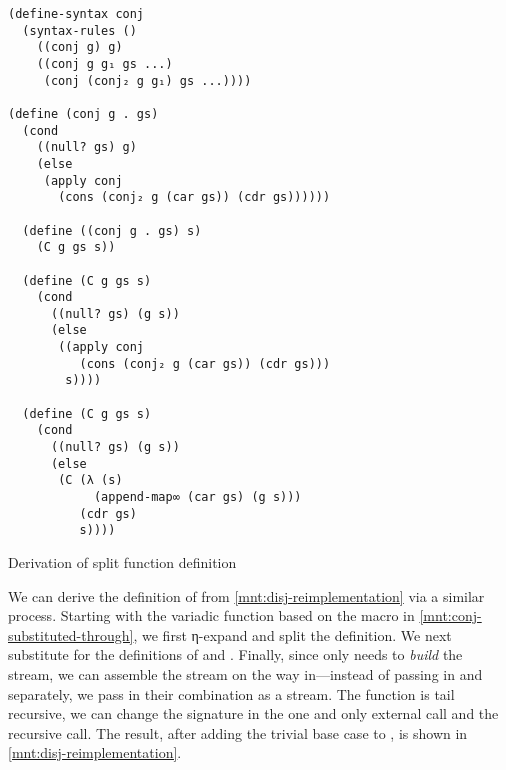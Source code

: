 \documentclass[sigplan,balance,pbalance,natbib=false]{acmart}
\begin{document}
\begin{listing}
\begin{verbatim}
(define-syntax conj
  (syntax-rules ()
    ((conj g) g)
    ((conj g g₁ gs ...)
     (conj (conj₂ g g₁) gs ...))))

(define (conj g . gs)
  (cond
    ((null? gs) g)
    (else
     (apply conj
       (cons (conj₂ g (car gs)) (cdr gs))))))

  (define ((conj g . gs) s)
    (C g gs s))

  (define (C g gs s)
    (cond
      ((null? gs) (g s))
      (else
       ((apply conj
          (cons (conj₂ g (car gs)) (cdr gs)))
        s))))

  (define (C g gs s)
    (cond
      ((null? gs) (g s))
      (else
       (C (λ (s)
            (append-map∞ (car gs) (g s)))
          (cdr gs)
          s))))
\end{verbatim}
  \caption{Derivation of split  function definition}\label{mnt:conj-substituted-through}
\end{listing}

We can derive the definition of  from
\cref{mnt:disj-reimplementation} via a similar process. Starting with
the variadic function based on the macro in
\cref{mnt:conj-substituted-through}, we first η-expand and split the
definition. We next substitute for the definitions
of  and . Finally,
since  only needs  to \emph{build} the
stream, we can assemble the stream on the way in---instead of passing
in  and  separately, we pass in their
combination as a stream. The function is tail recursive, we can change
the signature in the one and only external call and the recursive
call. The result, after adding the trivial base case
to , is shown in \cref{mnt:disj-reimplementation}.
\end{document}
